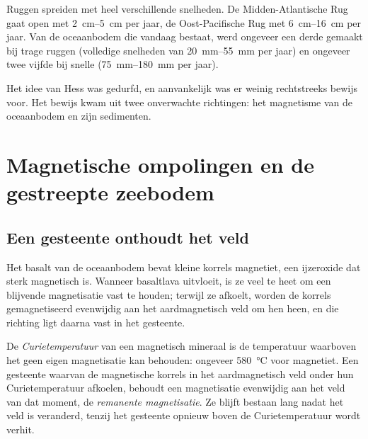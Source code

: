 Ruggen spreiden met heel verschillende snelheden. De Midden-Atlantische Rug gaat
open met \qtyrange{2}{5}{cm} per jaar, de Oost-Pacifische Rug met
\qtyrange{6}{16}{cm} per jaar. Van de oceaanbodem die vandaag bestaat, werd
ongeveer een derde gemaakt bij trage ruggen (volledige snelheden van
\qtyrange{20}{55}{mm} per jaar) en ongeveer twee vijfde bij snelle
(\qtyrange{75}{180}{mm} per jaar).

Het idee van Hess was gedurfd, en aanvankelijk was er weinig rechtstreeks bewijs
voor. Het bewijs kwam uit twee onverwachte richtingen: het magnetisme van de
oceaanbodem en zijn sedimenten.

\section{Magnetische ompolingen en de gestreepte zeebodem}

\subsection{Een gesteente onthoudt het veld}

Het basalt van de oceaanbodem bevat kleine korrels magnetiet, een ijzeroxide dat
sterk magnetisch is. Wanneer basaltlava uitvloeit, is ze veel te heet om een
blijvende magnetisatie vast te houden; terwijl ze afkoelt, worden de korrels
gemagnetiseerd evenwijdig aan het aardmagnetisch veld om hen heen, en die richting
ligt daarna vast in het gesteente.

\begin{definition}\label{def:g11:drift-to-spreading:remanence}
De \emph{Curietemperatuur} van een magnetisch mineraal is
de temperatuur waarboven het geen eigen magnetisatie kan behouden: ongeveer
\qty{580}{\celsius} voor magnetiet. Een gesteente waarvan de magnetische korrels
in het aardmagnetisch veld onder hun Curietemperatuur afkoelen, behoudt een
magnetisatie evenwijdig aan het veld van dat moment, de
\emph{remanente magnetisatie}. Ze blijft bestaan
lang nadat het veld is veranderd, tenzij het gesteente opnieuw boven de
Curietemperatuur wordt verhit.
\end{definition}

